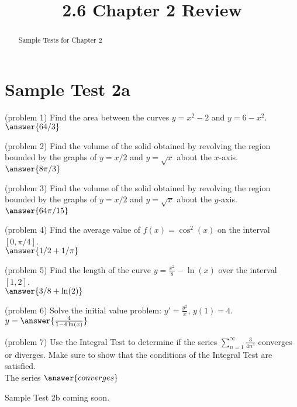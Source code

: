 \documentclass[handout]{ximera}
\title{2.6 Chapter 2 Review}
\begin{document}
\begin{abstract}
Sample Tests for Chapter 2
\end{abstract}

\maketitle

\section{Sample Test 2a}

\begin{problem}(problem 1)
Find the area between the curves $y = x^2 - 2$ and $y = 6 -x^2$.\\
$\answer{64/3}$
\end{problem}


\begin{problem}(problem 2)
Find the volume of the solid obtained by revolving the region bounded by the 
graphs of $y = x/2$ and $y = \sqrt x$ about the $x$-axis.\\
$\answer{8\pi/3}$
\end{problem}


\begin{problem}(problem 3)
Find the volume of the solid obtained by revolving the region bounded by the 
graphs of $y = x/2$ and $y = \sqrt x$ about the $y$-axis.\\
$\answer{64\pi/15}$
\end{problem}


\begin{problem}(problem 4)
Find the average value of $f(x) = \cos^2(x)$ on the interval $[0, \pi/4]$.\\
$\answer{1/2 + 1/\pi}$
\end{problem}


\begin{problem}(problem 5)
Find the length of the curve $\displaystyle y = \frac{x^2}{8} - \ln(x)$ over the interval $[1, 2]$.\\
$\answer{3/8 + \ln(2)}$
\end{problem}


\begin{problem}(problem 6)
Solve the initial value problem: $\displaystyle y' = \frac{y^2}{x},\, y(1) = 4$.\\
$y = \answer{\frac{4}{1- 4\ln(x)}}$
\end{problem}


\begin{problem}(problem 7)
Use the Integral Test to determine if the series $\displaystyle \sum_{n=1}^\infty \frac{3}{4n^3}$
converges or diverges. Make sure to show that the
conditions of the Integral Test are satisfied.\\
The series $\answer{converges}$
\end{problem}

Sample Test 2b coming soon.
\end{document}
